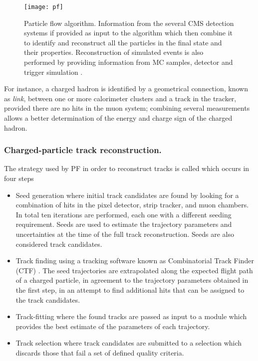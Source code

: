 \begin{figure}[!h]
  \centering
  \texttt{[image: pf]}
  \caption[Particle flow algorithm.]{Particle flow algorithm. Information from the several CMS detection systems if provided as input to the algorithm which then combine it to identify and reconstruct all the particles in the final state and their properties. Reconstruction of simulated events is also performed by providing information from MC samples, detector and trigger simulation \cite{pfdiag}.}\label{fig:pf}
\end{figure}

For instance, a charged hadron is identified by a geometrical connection, known as \textit{link}, between one or more calorimeter clusters and a track in the tracker, provided there are no hits in the muon system; combining several measurements allows a better determination of the energy and charge sign of the charged hadron.   


\subsubsection*{Charged-particle track reconstruction.}

The strategy used by PF in order to reconstruct tracks is called  which occurs in four steps

\begin{itemize}
\item Seed generation where initial track candidates are found by looking for a combination of hits in the pixel detector, strip tracker, and muon chambers. In total ten iterations are performed, each one with a different seeding requirement. Seeds are used to estimate the trajectory parameters and uncertainties at the time of the full track reconstruction. Seeds are also considered track candidates.    
\item Track finding using a tracking software known as Combinatorial Track Finder (CTF) \cite{ctf}. The seed trajectories are extrapolated along the expected flight path of a charged particle, in agreement to the trajectory parameters obtained in the first step, in an attempt to find additional hits that can be assigned to the track candidates. 
\item Track-fitting where the found tracks are passed as input to a module which provides the best estimate of the parameters of each trajectory.
\item Track selection where track candidates are submitted to a selection which discards those that fail a set of defined quality criteria.
\end{itemize}

